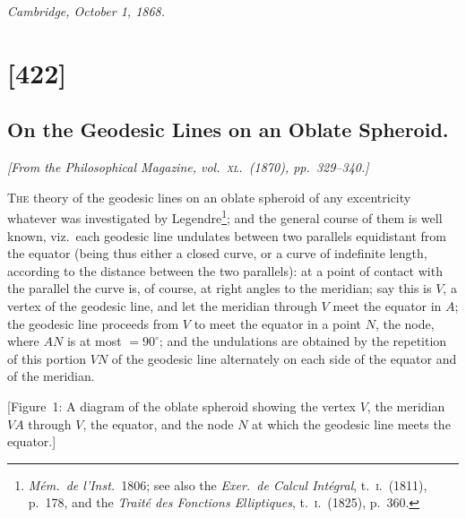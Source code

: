 \documentclass[11pt,a4paper]{article}
\begin{document}
\begin{flushright}
\textit{Cambridge, October 1, 1868.}
\end{flushright}

\clearpage

\section*{[422]}
\subsection*{On the Geodesic Lines on an Oblate Spheroid.}

\begin{center}
\textit{[From the Philosophical Magazine, vol.~\textsc{xl}.\ (1870), pp.~329--340.]}
\end{center}

\textsc{The} theory of the geodesic lines on an oblate spheroid of any
excentricity whatever was investigated by Legendre\footnote{\textit{M\'em.\ de
l'Inst.}\ 1806; see also the \textit{Exer.\ de Calcul Int\'egral}, t.~\textsc{i}.\
(1811), p.~178, and the \textit{Trait\'e des Fonctions Elliptiques}, t.~\textsc{i}.\
(1825), p.~360.}; and the general course of them is well known, viz.\ each
geodesic line undulates between two parallels equidistant from the equator
(being thus either a closed curve, or a curve of indefinite length, according
to the distance between the two parallels): at a point of contact with the
parallel the curve is, of course, at right angles to the meridian; say this is
$V$, a vertex of the geodesic line, and let the meridian through $V$ meet the
equator in $A$; the geodesic line proceeds from $V$ to meet the equator in a
point $N$, the node, where $AN$ is at most $=90^\circ$; and the undulations are
obtained by the repetition of this portion $VN$ of the geodesic line
alternately on each side of the equator and of the meridian.

[Figure~1: A diagram of the oblate spheroid showing the vertex $V$, the
meridian $VA$ through $V$, the equator, and the node $N$ at which the geodesic
line meets the equator.]

\medskip
\end{document}
